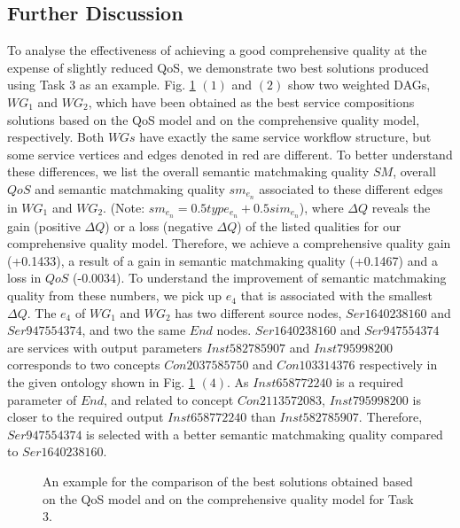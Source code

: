 \subsection{Further Discussion}\label{discuss1}
To analyse the effectiveness of achieving a good comprehensive quality at the expense of slightly reduced QoS, we demonstrate two best solutions produced using Task 3 as an example. Fig. \ref{comparisontest} $(1)$ and $(2)$ show two weighted DAGs, $WG_1$ and $WG_2$, which have been obtained as the best service compositions solutions based on the QoS model and on the comprehensive quality model, respectively. Both $WGs$ have exactly the same service workflow structure, but some service vertices and edges denoted in red are different. To better understand these differences, we list the overall semantic matchmaking quality $SM$,  overall $QoS$ and semantic matchmaking quality $sm_{e_n}$ associated to these different edges in $WG_1$ and $WG_2$. (Note: $sm_{e_n} = 0.5type_{e_n} + 0.5 sim_{e_n}$), where $\Delta Q$ reveals the gain (positive $\Delta Q$) or a loss (negative $\Delta Q$) of the listed qualities for our comprehensive quality model. Therefore, we achieve a comprehensive quality gain (+0.1433), a result of a gain in semantic matchmaking quality (+0.1467) and a loss in $QoS$ (-0.0034). To understand the improvement of semantic matchmaking quality from these numbers, we pick up $e_4$ that is associated with the smallest $\Delta Q$. The $e_4$ of $WG_1$ and $WG_2$ has two different source nodes, $Ser1640238160$ and $Ser947554374$, and two the same $End$ nodes. $Ser1640238160$ and $Ser947554374$ are services with output parameters $Inst582785907$ and  $Inst795998200$ corresponds to two concepts $Con2037585750$ and $Con103314376$ respectively in the given ontology shown in Fig. \ref{comparisontest} $(4)$. As $Inst658772240$ is a required parameter of $End$, and related to concept $Con2113572083$, $Inst795998200$ is closer to the required output $Inst658772240$ than $Inst582785907$. Therefore,  $Ser947554374$ is selected with a better semantic matchmaking quality compared to $Ser1640238160$.
\begin{figure}[h]
 \caption{An example for the comparison of the best solutions obtained based on the QoS model and on the comprehensive quality model for Task 3.}
 \label{comparisontest}
\end{figure}

